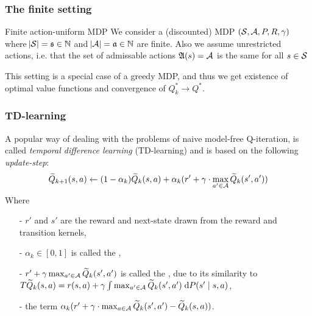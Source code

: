 \documentclass{beamer}[10]
\begin{document}
\begin{frame}
  \frametitle{The finite setting}
  \begin{block}{Finite action-uniform MDP}
    We consider a (discounted) MDP $(\mathcal{S}, \mathcal{A}, P, R, \gamma)$ where
    $\abs{\mathcal{S}} = \frak{s} \in \mathbb{N}$ and $\abs{\mathcal{A}} = \frak{a} \in \mathbb{N}$
    are finite.
    Also we assume unrestricted actions, i.e. that the set of admissable
    actions $\frak{A}(s) = \mathcal{A}$ is the same for all $s \in \mathcal{S}$
  \end{block}
  This setting is a special case of a greedy MDP, and thus we get existence
  of optimal value functions and convergence of $Q^*_k \to Q^*$.
\end{frame}

\begin{frame}
  \frametitle{TD-learning}
  \begingroup \footnotesize
  A popular way of dealing with the problems of naive model-free Q-iteration,
  is called \emph{temporal difference learning} (TD-learning)
  and is based on the following \emph{update-step}:
  \begin{equation*}
    \widetilde{Q}_{k+1}(s, a) \leftarrow (1-\alpha_k) \widetilde{Q}_k(s, a)
    + \alpha_k (r' + \gamma \cdot \max_{a' \in \mathcal{A}} \widetilde{Q}_k(s', a'))
  \end{equation*}
  Where
  \begin{itemize}
    \item[-] $r'$ and $s'$ are the reward and next-state drawn from the
      reward and transition kernels,
    \item[-] $\alpha_k \in [0,1]$ is called the ,
    \item[-] $r' + \gamma \max_{a' \in \mathcal{A}} \widetilde{Q}_k(s', a')$
      is called the , due to its similarity to
      $T \widetilde{Q}_k(s, a)
      = r(s, a) + \gamma \int \max_{a' \in \mathcal{A}} \widetilde{Q}_k(s', a')
      \; \mathrm{d} P(s' \mid s, a)$,
    \item[-] the  term
      $ \alpha_k ( r' + \gamma \cdot \max_{a \in \mathcal{A}} \widetilde{Q}_k(s', a')
      - \widetilde{Q}_k(s, a) )$.
  \end{itemize}
  \endgroup
\end{frame}
\end{document}
